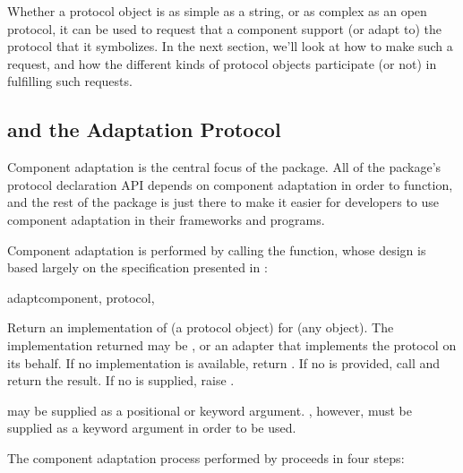 Whether a protocol object is as simple as a string, or as complex as an
open protocol, it can be used to request that a component support
(or adapt to) the protocol that it symbolizes.  In the next section, we'll
look at how to make such a request, and how the different kinds of protocol
objects participate (or not) in fulfilling such requests.


\subsection{ and the Adaptation Protocol
\label{adapt-protocol}}

Component adaptation is the central focus of the  package.
All of the package's protocol declaration API depends on component adaptation
in order to function, and the rest of the package is just there to make it
easier for developers to use component adaptation in their frameworks and
programs.

Component adaptation is performed by calling the  function,
whose design is based largely on the specification presented in :

\begin{funcdesc}{adapt}{component, protocol,
}

Return an implementation of  (a protocol object) for
 (any object).  The implementation returned may be
, or an adapter that implements the protocol on its
behalf.  If no implementation is available, return .  If no
 is provided, call  and return the result.  If no  is supplied,
raise .

 may be supplied as a positional or keyword argument.
, however, must be supplied as a keyword argument in order
to be used.

\end{funcdesc}

The component adaptation process performed by  proceeds
in four steps:

